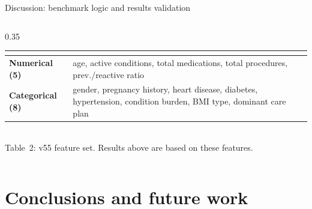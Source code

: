 \documentclass[aspectratio=169,11pt]{beamer}
\begin{document}
\begin{frame}{Discussion: benchmark logic and results validation}
\begin{columns}[T]
\begin{column}{0.35\textwidth}
      \renewcommand{\arraystretch}{1.2}
      \begin{tabular}{@{}>{\bfseries}p{1.7cm} >{\raggedright\arraybackslash}p{4.1cm}@{}}
        \toprule
        \multicolumn{2}{@{}l@{}}{\color{hospaccent}\bfseries v55 feature set ($k=4$)} \\
        \midrule
        Numerical (5) & age, active conditions, total medications, total procedures, prev./reactive ratio \\[3pt]
        Categorical (8) & gender, pregnancy history, heart disease, diabetes, hypertension, condition burden, BMI type, dominant care plan \\
        \bottomrule
      \end{tabular}\\[4pt]
      {\scriptsize\color{hospgray} Table~2: v55 feature set. Results above are based on these features.}
    \end{column}
  \end{columns}
\end{frame}

\section{Conclusions and future work}
\end{document}
